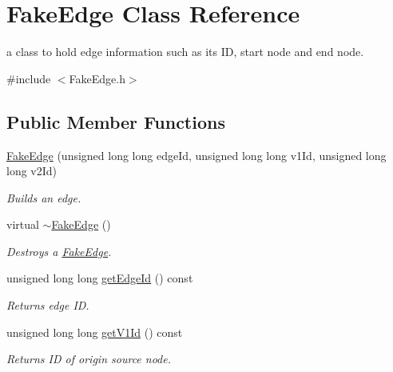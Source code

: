 \hypertarget{class_fake_edge}{}\section{Fake\+Edge Class Reference}
\label{class_fake_edge}


a class to hold edge information such as it\textquotesingle{}s ID, start node and end node.  




{\ttfamily \#include $<$Fake\+Edge.\+h$>$}

\subsection*{Public Member Functions}
\begin{DoxyCompactItemize}
\item 
\hyperlink{class_fake_edge_a6a68d323de9a406e367dc02e4e20c926}{Fake\+Edge} (unsigned long long edge\+Id, unsigned long long v1\+Id, unsigned long long v2\+Id)
\begin{DoxyCompactList}\small\item\em Builds an edge. \end{DoxyCompactList}\item 
\hypertarget{class_fake_edge_a609a3f812106bd7e4afc07b83197defa}{}\label{class_fake_edge_a609a3f812106bd7e4afc07b83197defa} 
virtual \hyperlink{class_fake_edge_a609a3f812106bd7e4afc07b83197defa}{$\sim$\+Fake\+Edge} ()
\begin{DoxyCompactList}\small\item\em Destroys a \hyperlink{class_fake_edge}{Fake\+Edge}. \end{DoxyCompactList}\item 
\hypertarget{class_fake_edge_a0c723f87e55530833392f737851e4770}{}\label{class_fake_edge_a0c723f87e55530833392f737851e4770} 
unsigned long long \hyperlink{class_fake_edge_a0c723f87e55530833392f737851e4770}{get\+Edge\+Id} () const
\begin{DoxyCompactList}\small\item\em Returns edge ID. \end{DoxyCompactList}\item 
\hypertarget{class_fake_edge_ab2b7d430c5f9f6d75d78a390c7112fa6}{}\label{class_fake_edge_ab2b7d430c5f9f6d75d78a390c7112fa6} 
unsigned long long \hyperlink{class_fake_edge_ab2b7d430c5f9f6d75d78a390c7112fa6}{get\+V1\+Id} () const
\begin{DoxyCompactList}\small\item\em Returns ID of origin source node. \end{DoxyCompactList}\item 

\end{DoxyCompactItemize}
